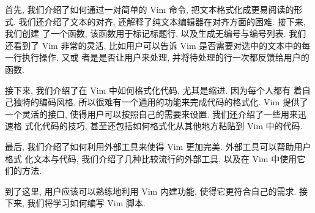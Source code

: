 首先, 我们介绍了如何通过一对简单的 Vim 命令, 把文本格式化成更易阅读的形式.
我们还介绍了文本的对齐, 还解释了纯文本编辑器在对齐方面的困难. 接下来, 我们创建
了一个函数, 该函数用于标记标题行, 以及生成无编号与编号列表. 我们还看到了 Vim
非常的灵活, 比如用户可以告诉 Vim 是否需要对选中的文本中的每一行执行操作, 又或
者是是否让用户来处理, 并将待处理的行一次都反馈给用户的函数.

接下来, 我们介绍了在 Vim 中如何格式化代码, 尤其是缩进. 因为每个人都有
着自己独特的编码风格, 所以很难有一个通用的功能来完成代码的格式化. Vim 提供了
一个灵活的接口, 使得用户可以按照自己的需要来设置. 我们还介绍了一些用来迅速格
式化代码的技巧, 甚至还包括如何格式化从其他地方粘贴到 Vim 中的代码.

最后, 我们介绍了如何利用外部工具来使得 Vim 更加完美. 外部工具可以帮助用户格式
化文本与代码, 我们介绍了几种比较流行的外部工具, 以及在 Vim 中使用它们的方法.

到了这里, 用户应该可以熟练地利用 Vim 内建功能, 使得它更符合自己的需求. 接下来,
我们将学习如何编写 Vim 脚本.
